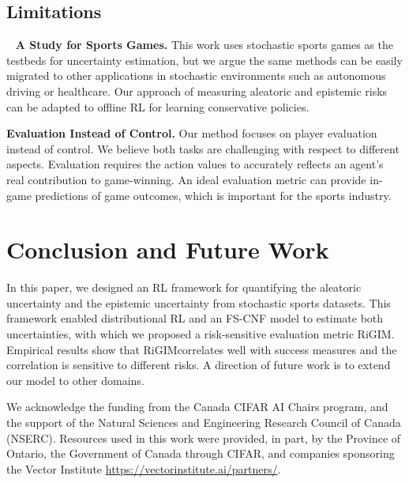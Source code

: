 \documentclass{article}
\newcommand{\sys}{RiGIM}
\newcommand{\system}{\sys\;}
\begin{document}
\subsection{Limitations}~\label{subsec:limitations}
\noindent\textbf{A Study for Sports Games.} This work uses stochastic sports games as the testbeds for uncertainty estimation, but we argue the same methods can be easily migrated to other applications in stochastic environments such as autonomous driving or healthcare. Our approach of measuring aleatoric and epistemic risks can be adapted to offline RL for learning conservative policies.

\noindent\textbf{Evaluation Instead of Control.} Our method focuses on player evaluation instead of control. We believe both tasks are challenging with respect to different aspects. Evaluation requires the action values to accurately reflects an agent's real contribution to game-winning. An ideal evaluation metric can provide in-game predictions of game outcomes, which is important for the sports industry.
\section{Conclusion and Future Work}
In this paper, we designed an RL framework for quantifying the aleatoric uncertainty and the epistemic uncertainty from stochastic sports datasets. This framework enabled distributional RL and an FS-CNF model to estimate both uncertainties, with which we proposed a risk-sensitive evaluation metric \system. Empirical results show that \system correlates well with success measures and the correlation is sensitive to different risks. A direction of future work is to extend our model to other domains.

\begin{ack}
We acknowledge the funding from the Canada CIFAR AI Chairs program, and the support of the Natural Sciences and Engineering Research Council of Canada (NSERC). Resources used in this work were provided, in part, by the Province of Ontario, the Government of Canada through CIFAR, and companies sponsoring the Vector Institute     \url{https://vectorinstitute.ai/partners/}.
\end{ack}



\end{document}
